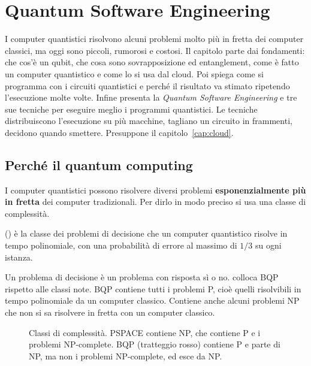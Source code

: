 \chapter{Quantum Software Engineering}
\label{cap:quantum}

\begin{inbreve}
I computer quantistici risolvono alcuni problemi molto più in fretta dei computer classici, ma oggi sono piccoli,
rumorosi e costosi. Il capitolo parte dai fondamenti: che cos'è un qubit, che cosa sono sovrapposizione ed
entanglement, come è fatto un computer quantistico e come lo si usa dal cloud. Poi spiega come si programma con i
circuiti quantistici e perché il risultato va stimato ripetendo l'esecuzione molte volte. Infine presenta la
\emph{Quantum Software Engineering} e tre sue tecniche per eseguire meglio i programmi quantistici. Le tecniche
distribuiscono l'esecuzione su più macchine, tagliano un circuito in frammenti, decidono quando smettere. Presuppone il
capitolo~\ref{cap:cloud}.
\end{inbreve}

\section{Perché il quantum computing}
\label{sec:qse-perche}

I computer quantistici possono risolvere diversi problemi \textbf{esponenzialmente più in fretta} dei computer
tradizionali. Per dirlo in modo preciso si usa una classe di complessità.

\begin{definizione}[BQP]
 () è la classe dei problemi di decisione che un computer
quantistico risolve in tempo polinomiale, con una probabilità di errore al massimo di $1/3$ su ogni istanza.
\end{definizione}

Un problema di decisione è un problema con risposta sì o no.  colloca BQP rispetto alle classi
note. BQP contiene tutti i problemi P, cioè quelli risolvibili in tempo polinomiale da un computer classico. Contiene
anche alcuni problemi NP che non si sa risolvere in fretta con un computer classico.

\begin{figure}[ht]
\centering
{}
\caption{Classi di complessità. PSPACE contiene NP, che contiene P e i problemi NP-complete. BQP (tratteggio rosso)
contiene P e parte di NP, ma non i problemi NP-complete, ed esce da NP.}
\label{fig:qse-classi}
\end{figure}

